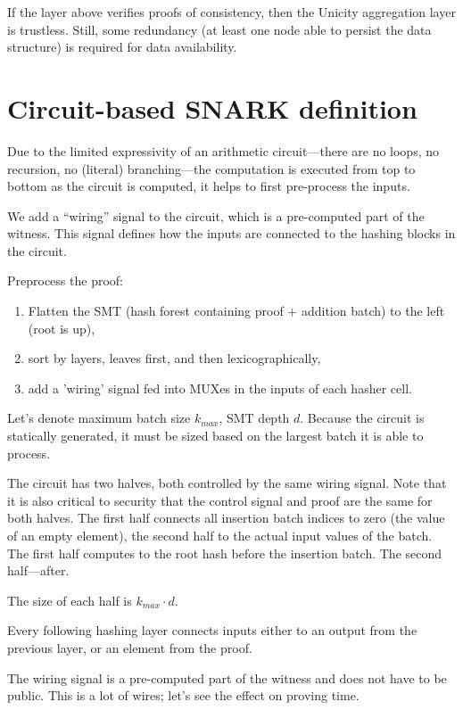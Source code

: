 \documentclass[twocolumn]{article}
\begin{document}
If the layer above verifies proofs of consistency, then the Unicity aggregation layer is trustless. Still, some redundancy (at least one node able to persist the data structure) is required for data availability.


\section{Circuit-based SNARK definition}

Due to the limited expressivity of an arithmetic circuit---there are no loops, no recursion, no (literal) branching---the computation is executed from top to bottom as the circuit is computed, it helps to first pre-process the inputs.

We add a ``wiring'' signal to the circuit, which is a pre-computed part of the witness. This signal defines how the inputs are connected to the hashing blocks in the circuit.

Preprocess the proof:

\begin{enumerate}
    \item Flatten the SMT (hash forest containing proof + addition batch) to the left (root is up),
    \item sort by layers, leaves first, and then lexicographically,
    \item add a 'wiring' signal fed into MUXes in the inputs of each hasher cell.
\end{enumerate}

Let's denote maximum batch size $k_{max}$, SMT depth $d$. Because the circuit is statically generated, it must be sized based on the largest batch it is able to process.

The circuit has two halves, both controlled by the same wiring signal. Note that it is also critical to security that the control signal and proof are the same for both halves. The first half connects all insertion batch indices to zero (the value of an empty element), the second half to the actual input values of the batch.
The first half computes to the root hash before the insertion batch. The second half---after.

The size of each half is $k_{max} \cdot d$.

Every following hashing layer connects inputs either to an output from the previous layer, or an element from the proof.

The wiring signal is a pre-computed part of the witness and does not have to be public. This is a lot of wires; let's see the effect on proving time.
\end{document}
